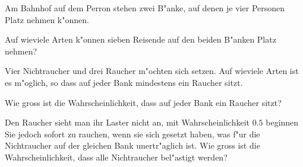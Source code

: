 Am Bahnhof auf dem Perron stehen zwei B"anke, auf denen je vier
Personen Platz nehmen k"onnen.
\begin{teilaufgaben}
\item
Auf wieviele Arten k"onnen sieben Reisende auf den beiden B"anken Platz
nehmen?
\item
Vier Nichtraucher und drei Raucher m"ochten sich setzen.
Auf wieviele Arten ist es m"oglich, so dass auf jeder Bank mindestens
ein Raucher sitzt.
\item
Wie gross ist die Wahrscheinlichkeit, dass auf jeder Bank ein Raucher
sitzt?
\item
Den Raucher sieht man ihr Laster nicht an, mit Wahrscheinlichkeit $0.5$
beginnen Sie jedoch sofort zu rauchen, wenn sie sich gesetzt haben, was
f"ur die Nichtraucher auf der gleichen Bank unertr"aglich ist.
Wie gross ist die Wahrscheinlichkeit, dass alle Nichtraucher bel"astigt
werden?
\end{teilaufgaben}

